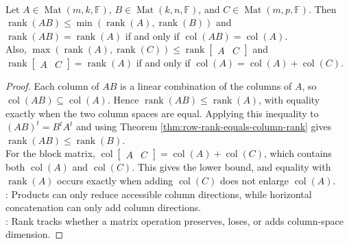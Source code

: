 \begin{theorem} \label{thm:rank-product-and-concatenation-bounds} \\
Let $A\in\operatorname{Mat}(m,k,\mathbb{F})$, $B\in\operatorname{Mat}(k,n,\mathbb{F})$, and $C\in\operatorname{Mat}(m,p,\mathbb{F})$. Then $\operatorname{rank}(AB)\leq \min(\operatorname{rank}(A),\operatorname{rank}(B))$ and $\operatorname{rank}(AB)=\operatorname{rank}(A)$ if and only if $\operatorname{col}(AB)=\operatorname{col}(A)$.\\
Also, $\max(\operatorname{rank}(A),\operatorname{rank}(C))\leq\operatorname{rank}\!\begin{bmatrix}A & C\end{bmatrix}$ and $\operatorname{rank}\!\begin{bmatrix}A & C\end{bmatrix}=\operatorname{rank}(A)$ if and only if $\operatorname{col}(A)=\operatorname{col}(A)+\operatorname{col}(C)$.
\begin{proof}
Each column of $AB$ is a linear combination of the columns of $A$, so $\operatorname{col}(AB)\subseteq\operatorname{col}(A)$. Hence $\operatorname{rank}(AB)\leq\operatorname{rank}(A)$, with equality exactly when the two column spaces are equal. Applying this inequality to $(AB)^t=B^tA^t$ and using Theorem \ref{thm:row-rank-equals-column-rank} gives $\operatorname{rank}(AB)\leq\operatorname{rank}(B)$.\\
For the block matrix, $\operatorname{col}\!\begin{bmatrix}A & C\end{bmatrix}=\operatorname{col}(A)+\operatorname{col}(C)$, which contains both $\operatorname{col}(A)$ and $\operatorname{col}(C)$. This gives the lower bound, and equality with $\operatorname{rank}(A)$ occurs exactly when adding $\operatorname{col}(C)$ does not enlarge $\operatorname{col}(A)$.\\
: Products can only reduce accessible column directions, while horizontal concatenation can only add column directions.\\
: Rank tracks whether a matrix operation preserves, loses, or adds column-space dimension.
\end{proof}
\end{theorem}

